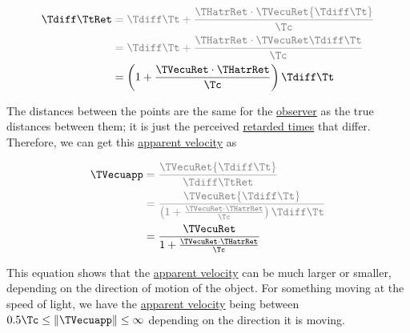 \begin{equation}
	\begin{aligned}
		\Tdiff \TtRet  & \color{gray} =   \Tdiff \Tt  + \frac{\THatrRet   \cdot \TVecuRet  {\Tdiff \Tt }  }{\Tc }  \\
		         & \color{gray} = \Tdiff \Tt  + \frac{\THatrRet   \cdot \TVecuRet  \Tdiff \Tt }{\Tc }  \\
		         & = \left( 1 + \frac{\TVecuRet  \cdot \THatrRet   }{\Tc } \right) \Tdiff \Tt
	\end{aligned}
\end{equation}

The distances between the points are the same for the \hyperlink{def-observer}{observer} as the true distances between them; it is just the perceived \hyperlink{def-retarded-time}{retarded times} that differ.
Therefore, we can get this \hyperlink{def-apparent-velocity}{apparent velocity} as

\begin{equation}
	\begin{aligned}
		\TVecuapp  & \color{gray}= \frac{\TVecuRet  {\Tdiff \Tt }  }{\Tdiff \TtRet  }                                                                \\
		                    & \color{gray}= \frac{\TVecuRet  {\Tdiff \Tt }  }{\left( 1 + \frac{\TVecuRet  \cdot \THatrRet   }{\Tc } \right) \Tdiff \Tt } \\
		                    & = \frac{\TVecuRet  }{1 + \frac{\TVecuRet  \cdot \THatrRet   }{\Tc } }
	\end{aligned}
\end{equation}

This equation shows that the \hyperlink{def-apparent-velocity}{apparent velocity} can be much larger or smaller, depending on the direction of motion of the object.
For something moving at the speed of light, we have the \hyperlink{def-apparent-velocity}{apparent velocity} being between $ 0.5 \Tc  \leq \|\TVecuapp \| \leq \infty $ depending on the direction it is moving.

